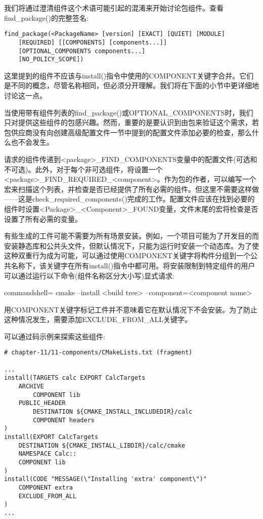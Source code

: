 
我们将通过澄清组件这个术语可能引起的混淆来开始讨论包组件。查看find\_package()的完整签名:

\begin{lstlisting}[style=styleCMake]
find_package(<PackageName> [version] [EXACT] [QUIET] [MODULE]
	[REQUIRED] [[COMPONENTS] [components...]]
	[OPTIONAL_COMPONENTS components...]
	[NO_POLICY_SCOPE])
\end{lstlisting}

这里提到的组件不应该与install()指令中使用的COMPONENT关键字合并。它们是不同的概念，尽管名称相同，但必须分开理解。我们将在下面的小节中更详细地讨论这一点。


当使用带有组件列表的find\_package()或OPTIONAL\_COMPONENTS时，我们只对提供这些组件的包感兴趣。然而，重要的是要认识到由包来验证这个需求，若包供应商没有向创建高级配置文件一节中提到的配置文件添加必要的检查，那么什么也不会发生。

请求的组件传递到<package>\_FIND\_COMPONENTS变量中的配置文件(可选和不可选)。此外，对于每个非可选组件，将设置一个<package>\_FIND\_REQUIRED\_<component>。作为包的作者，可以编写一个宏来扫描这个列表，并检查是否已经提供了所有必需的组件。但这里不需要这样做——这是check\_required\_components()完成的工作。配置文件应该在找到必要的组件时设置<Package>\_<Component>\_FOUND变量，文件末尾的宏将检查是否设置了所有必需的变量。


有些生成的工件可能不需要为所有场景安装。例如，一个项目可能为了开发目的而安装静态库和公共头文件，但默认情况下，只能为运行时安装一个动态库。为了使这种双重行为成为可能，可以通过使用COMPONENT关键字将构件分组到一个公共名称下，该关键字在所有install()指令中都可用。将安装限制到特定组件的用户可以通过运行以下命令(组件名称区分大小写)显式请求:

\begin{tcblisting}{commandshell={}}
cmake --install <build tree> --component=<component name>
\end{tcblisting}

用COMPONENT关键字标记工件并不意味着它在默认情况下不会安装。为了防止这种情况发生，需要添加EXCLUDE\_FROM\_ALL关键字。

可以通过码示例来探索这些组件:

\begin{lstlisting}[style=styleCMake]
# chapter-11/11-components/CMakeLists.txt (fragment)

...
install(TARGETS calc EXPORT CalcTargets
	ARCHIVE
		COMPONENT lib
	PUBLIC_HEADER
		DESTINATION ${CMAKE_INSTALL_INCLUDEDIR}/calc
		COMPONENT headers
)
install(EXPORT CalcTargets
	DESTINATION ${CMAKE_INSTALL_LIBDIR}/calc/cmake
	NAMESPACE Calc::
	COMPONENT lib
)
install(CODE "MESSAGE(\"Installing 'extra' component\")"
	COMPONENT extra
	EXCLUDE_FROM_ALL
)
...
\end{lstlisting}


